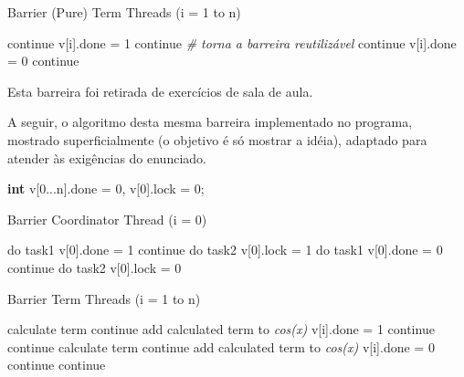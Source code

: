 \documentclass[11pt]{article}
\begin{document}
\begin{algorithm}[H]
\caption{Barrier (Pure) Term Threads (i = 1 to n)}
\begin{algorithmic}[1]
\State continue
\EndWhile
\State v[i].done = 1
\State continue
\EndWhile
\State \textit{\# torna a barreira reutilizável}
\State continue
\EndWhile
\State v[i].done = 0
\State continue
\EndWhile
\end{algorithmic}
\end{algorithm}

\begin{flushleft}
Esta barreira foi retirada de exercícios de sala de aula. \\
\end{flushleft}
A seguir, o algoritmo desta mesma barreira implementado no programa, mostrado superficialmente (o objetivo é só mostrar a idéia), adaptado para atender às exigências do enunciado.

\begin{flushleft}
\textbf{int} v[0...n].done = 0, v[0].lock = 0;
\end{flushleft}

\begin{algorithm}[H]
\caption{Barrier Coordinator Thread (i = 0)}
\begin{algorithmic}[1]
\State do task1
\State v[0].done = 1
\State continue
\EndWhile
\State do task2
\State v[0].lock = 1
\State do task1
\State v[0].done = 0
\State continue
\EndWhile
\State do task2
\State v[0].lock = 0
\end{algorithmic}
\end{algorithm}

\begin{algorithm}[H]
\caption{Barrier Term Threads (i = 1 to n)}
\begin{algorithmic}[1]
\State calculate term
\State continue
\EndWhile
\State add calculated term to \textit{cos(x)}
\State v[i].done = 1
\State continue
\EndWhile
{}
\State continue
\EndWhile
\State calculate term
\State continue
\EndWhile
\State add calculated term to \textit{cos(x)}
\State v[i].done = 0
\State continue
\EndWhile
{}
\State continue
\EndWhile
\end{algorithmic}
\end{algorithm}
\end{document}
